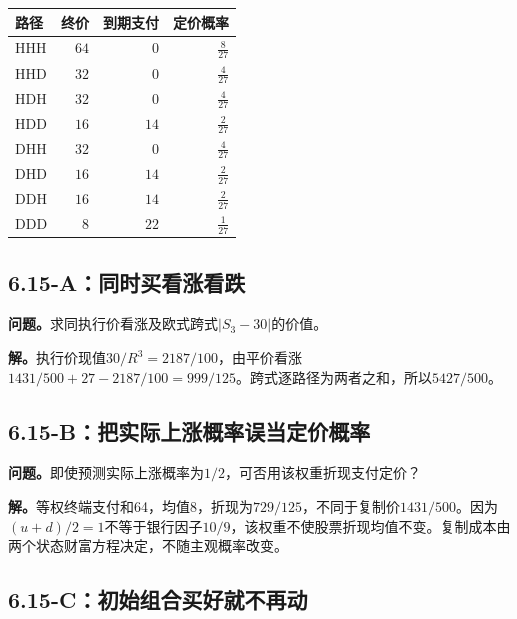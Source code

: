\documentclass[11pt,a4paper,UTF8,fontset=fandol]{ctexart}
\begin{document}
\begin{longtable}[]{@{}lrrr@{}}
\toprule\noalign{}
路径 & 终价 & 到期支付 & 定价概率 \\
\midrule\noalign{}
\endhead
\bottomrule\noalign{}
\endlastfoot
HHH & \(64\) & \(0\) & \(\frac{8}{27}\) \\
HHD & \(32\) & \(0\) & \(\frac{4}{27}\) \\
HDH & \(32\) & \(0\) & \(\frac{4}{27}\) \\
HDD & \(16\) & \(14\) & \(\frac{2}{27}\) \\
DHH & \(32\) & \(0\) & \(\frac{4}{27}\) \\
DHD & \(16\) & \(14\) & \(\frac{2}{27}\) \\
DDH & \(16\) & \(14\) & \(\frac{2}{27}\) \\
DDD & \(8\) & \(22\) & \(\frac{1}{27}\) \\
\end{longtable}

\endgroup

\subsection{6.15-A：同时买看涨看跌}\label{aux540cux65f6ux4e70ux770bux6da8ux770bux8dcc}

\textbf{问题。}求同执行价看涨及欧式跨式\(|S_3-30|\)的价值。

\textbf{解。}执行价现值\(30/R^3=2187/100\)，由平价看涨\(1431/500+27-2187/100=\boxed{999/125}\)。跨式逐路径为两者之和，所以\(\boxed{5427/500}\)。

\subsection{6.15-B：把实际上涨概率误当定价概率}\label{bux628aux5b9eux9645ux4e0aux6da8ux6982ux7387ux8befux5f53ux5b9aux4ef7ux6982ux7387}

\textbf{问题。}即使预测实际上涨概率为\(1/2\)，可否用该权重折现支付定价？

\textbf{解。}等权终端支付和64，均值8，折现为\(\boxed{729/125}\)，不同于复制价\(1431/500\)。因为\((u+d)/2=1\)不等于银行因子\(10/9\)，该权重不使股票折现均值不变。复制成本由两个状态财富方程决定，不随主观概率改变。

\subsection{6.15-C：初始组合买好就不再动}\label{cux521dux59cbux7ec4ux5408ux4e70ux597dux5c31ux4e0dux518dux52a8}
\end{document}

